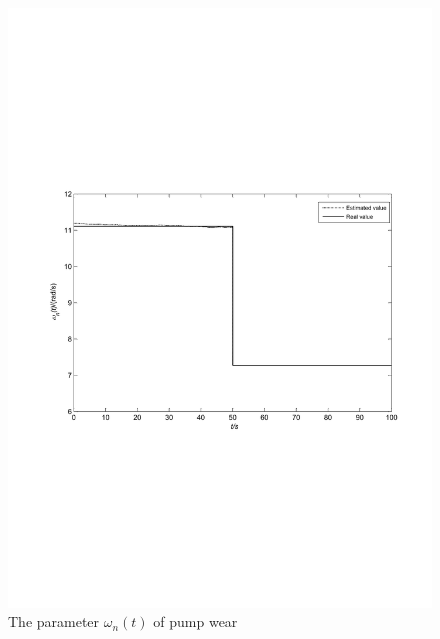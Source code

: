 \documentclass{article}
\begin{document}
\begin{figure}[!htb]
  \centering
  \includegraphics[width=\hsize]{fig6a.pdf}
  \caption{The parameter $\omega_n(t)$ of pump wear}
  \label{fig:6}
\end{figure}
\end{document}
